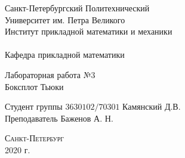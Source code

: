 \documentclass[a4]{article}
\begin{document}
\def\contentsname{\LARGE{Содержание}}
\thispagestyle{empty}
\begin{center} 
\vspace{2cm} 
{\Large \sc Санкт-Петербургский Политехнический}\\
\vspace{2mm}
{\Large \sc Университет} им. {\Large\sc Петра Великого}\\
\vspace{1cm}
{\large \sc Институт прикладной математики и механики\\ 
\vspace{0.5mm}
\textsc{}}\\ 
\vspace{0.5mm}
{\large\sc Кафедра прикладной математики}\\
\vspace{15mm}
{\huge \sc Лабораторная работа №$3$\\
	Боксплот Тьюки
	\vspace{6mm}
	
}
\vspace*{2mm}
\vspace{6cm} 
Студент группы $3630102/70301$ \hfill Камянский Д.В.\\
\vspace{1cm}
Преподаватель \hfill Баженов А. Н.\\
\vspace{20mm} 


\vfill {\large\textsc{Санкт-Петербург}}\\ 
2020 г.
\end{center}


\newpage
\pagestyle{plain}

\end{document}
